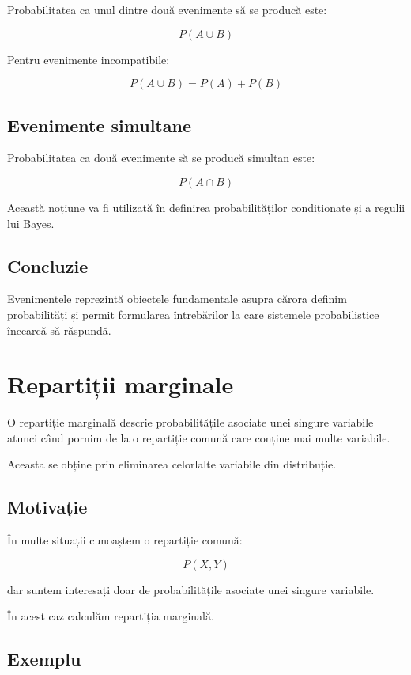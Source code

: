 \documentclass[12pt,a4paper]{article}
\begin{document}
Probabilitatea ca unul dintre două evenimente să se producă este:

\[
P(A \cup B)
\]

Pentru evenimente incompatibile:

\[
P(A \cup B)=P(A)+P(B)
\]

\subsection{Evenimente simultane}

Probabilitatea ca două evenimente să se producă simultan este:

\[
P(A \cap B)
\]

Această noțiune va fi utilizată în definirea probabilităților condiționate și a regulii lui Bayes.

\subsection{Concluzie}

Evenimentele reprezintă obiectele fundamentale asupra cărora definim probabilități și permit formularea întrebărilor la care sistemele probabilistice încearcă să răspundă.










\section{Repartiții marginale}

O repartiție marginală descrie probabilitățile asociate unei singure variabile atunci când pornim de la o repartiție comună care conține mai multe variabile.

Aceasta se obține prin eliminarea celorlalte variabile din distribuție.

\subsection{Motivație}

În multe situații cunoaștem o repartiție comună:

\[
P(X,Y)
\]

dar suntem interesați doar de probabilitățile asociate unei singure variabile.

În acest caz calculăm repartiția marginală.

\subsection{Exemplu}
\end{document}
